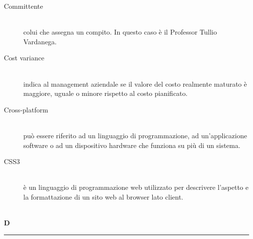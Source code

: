 \documentclass[12pt,a4paper]{article}
\begin{document}
\begin{description}
\item[Committente] 
\hfill\\ colui che assegna un compito. In questo caso è il Professor Tullio Vardanega.

\item[Cost variance] 
\hfill\\ indica al management aziendale se il valore del costo realmente maturato è maggiore, uguale o minore rispetto al costo pianificato.

\item[Cross-platform] 
\hfill\\ può essere riferito ad un linguaggio di programmazione, ad un'applicazione software o ad un dispositivo hardware che funziona su più di un sistema.

\item[CSS3] 
\hfill\\ è un linguaggio di programmazione web utilizzato per descrivere l'aspetto e la formattazione di un sito web al browser lato client.
\end{description}

\newpage

\begin{center}
\hfill\\
	\LARGE \textbf{D}
\hfill\\
\rule[15pt]{30pt}{0.5pt}
\end{center}
\end{document}
